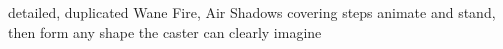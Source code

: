   {detailed, duplicated}%
  {Wane}%
  {Fire, Air}%
  {}%
  {Shadows covering  steps animate and stand, then form any shape the caster can clearly imagine}%
  {}
